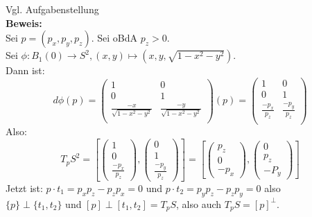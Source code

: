 \begin{problem}[2b] Vgl. Aufgabenstellung \\
  \textbf{Beweis:} \\
  Sei \( p = (p_x, p_y, p_z) \). Sei oBdA \( p_z > 0 \). \\
  Sei \( \phi : B_1(0) \to S^2, (x,y) \mapsto (x,y,\sqrt{ 1- x^2-y^2}) \). \\
  Dann ist:
  \begin{equation*} 
    d \phi(p) = 
    \begin{pmatrix}
      1 & 0 \\
      0 & 1 \\
      \frac{-x}{\sqrt{ 1 - x^2 -y^2}} & \frac{-y}{\sqrt{ 1 - x^2 -y^2}} \\
    \end{pmatrix}(p) = 
    \begin{pmatrix}
      1 & 0 \\
      0 & 1 \\
      \frac{-p_x}{p_z} & \frac{-p_y}{p_z} \\
    \end{pmatrix} 
  \end{equation*}
  Also:
  \begin{equation*}
    {T_p S}^2 = \left[
    \begin{pmatrix}
      1 \\
      0 \\
      \frac{-p_x}{p_z}
    \end{pmatrix},
    \begin{pmatrix}
      0 \\
      1 \\
      \frac{-p_y}{p_z}
    \end{pmatrix}
    \right] = \left[
    \begin{pmatrix}
      p_z\\
      0 \\
      -p_x
    \end{pmatrix},
    \begin{pmatrix}
      0 \\
      p_z \\
      -P_y
    \end{pmatrix}
    \right]
  \end{equation*}
  Jetzt ist: \( p \cdot t_1 = p_x p_z - p_z p_x = 0 \) und \( p \cdot t_2 = p_y p_z - p_z p_y = 0 \) also \\
  \( \{ p \} \perp \{ t_1,t_2 \} \) und \( [p] \perp [t_1,t_2] = T_p S \), also auch \( T_p S = {[p]}^{\perp} \).
\end{problem}

